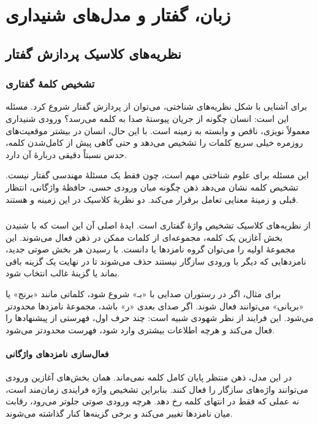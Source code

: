 \chapter{زبان، گفتار و مدل‌های شنیداری}

\section{نظریه‌های کلاسیک پردازش گفتار}

\subsection{تشخیص کلمهٔ گفتاری}
برای آشنایی با شکل نظریه‌های شناختی، می‌توان از پردازش گفتار شروع کرد. مسئله این است: انسان چگونه از جریان پیوستهٔ صدا به کلمه می‌رسد؟ ورودی شنیداری معمولاً نویزی، ناقص و وابسته به زمینه است. با این حال، انسان در بیشتر موقعیت‌های روزمره خیلی سریع کلمات را تشخیص می‌دهد و حتی گاهی پیش از کامل‌شدن کلمه، حدس نسبتاً دقیقی دربارهٔ آن دارد.

این مسئله برای علوم شناختی مهم است، چون فقط یک مسئلهٔ مهندسی گفتار نیست. تشخیص کلمه نشان می‌دهد ذهن چگونه میان ورودی حسی، حافظهٔ واژگانی، انتظار قبلی و زمینهٔ معنایی تعامل برقرار می‌کند. دو نظریهٔ کلاسیک در این زمینه  و  هستند.

\subsection{}
 از نظریه‌های کلاسیک تشخیص واژهٔ گفتاری است. ایدهٔ اصلی آن این است که با شنیدن بخش آغازین یک کلمه، مجموعه‌ای از کلمات ممکن در ذهن فعال می‌شوند. این مجموعهٔ اولیه را می‌توان گروه نامزدها یا  دانست. با رسیدن هر بخش صوتی جدید، نامزدهایی که دیگر با ورودی سازگار نیستند حذف می‌شوند تا در نهایت یک گزینه باقی بماند یا گزینهٔ غالب انتخاب شود.

برای مثال، اگر در رستوران صدایی با «بـ» شروع شود، کلماتی مانند «برنج» یا «بریانی» می‌توانند فعال شوند. اگر صدای بعدی «ر» باشد، مجموعهٔ نامزدها محدودتر می‌شود. این فرایند از نظر شهودی شبیه  است: چند حرف اول، فهرستی از پیشنهادها را فعال می‌کند و هرچه اطلاعات بیشتری وارد شود، فهرست محدودتر می‌شود.

\subsubsection{فعال‌سازی نامزدهای واژگانی}
در این مدل، ذهن منتظر پایان کامل کلمه نمی‌ماند. همان بخش‌های آغازین ورودی می‌توانند واژه‌های سازگار را فعال کنند. بنابراین تشخیص واژه فرایندی زمان‌مند است، نه عملی که فقط در انتهای کلمه رخ دهد. هرچه ورودی صوتی جلوتر می‌رود، رقابت میان نامزدها تغییر می‌کند و برخی گزینه‌ها کنار گذاشته می‌شوند.

